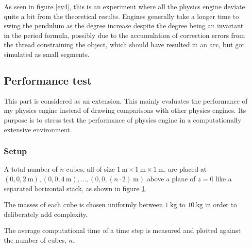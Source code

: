 \documentclass[12pt,a4paper,twoside,openright]{report}
\begin{document}
As seen in figure \ref{ev4}, this is an experiment where all the physics engine deviate quite a bit from the theoretical results. Engines generally take a longer time to swing the pendulum as the degree increase despite the degree being an invariant in the period formula, possibly due to the accumulation of correction errors from the thread constraining the object, which should have resulted in an arc, but got simulated as small segments.

\subsection{Performance test}

This part is considered as an extension. This mainly evaluates the performance of my physics engine instead of drawing comparisons with other physics engines. Its purpose is to stress test the performance of physics engine in a computationally extensive environment.

\subsubsection{Setup}

A total number of $n$ cubes, all of size $\SI{1}{\m} \times \SI{1}{\m} \times \SI{1}{\m}$, 
are placed at $(0, 0, \SI{2}{\m}), (0, 0, \SI{4}{\m}), \ldots, (0, 0, (n \cdot 2)\SI{}{\m})$ above a plane of $z = 0$ like a separated horizontal stack, 
as shown in figure \ref{ev0}.

The masses of each cube is chosen uniformly between $\SI{1}{\kg}$ to $\SI{10}{\kg}$ in order to deliberately add complexity.

\begin{figure}
    \captionsetup{labelsep=none}
\begin{center}
\end{center}
\caption{}
\label{ev0}
\end{figure}

The average computational time of a time step is measured and plotted against the number of cubes, $n$.
\end{document}
